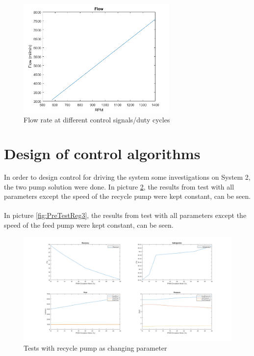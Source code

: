 \begin{figure}[h]
    \centering
    \includegraphics[width=0.7\textwidth]{Flow.png}
    \caption{Flow rate at different control signals/duty cycles}
    \label{fig:Flowrate}
\end{figure}


\section{Design of control algorithms}
In order to design control for driving the system some investigations on System 2, the two pump solution were done. In picture \ref{fig:PreTestReg1}, the results from test with all parameters except the speed of the recycle pump were kept constant, can be seen. \\
\\
In picture \ref{fig:PreTestReg3}, the results from test with all parameters except the speed of the feed pump were kept constant, can be seen.

\begin{figure}[h]
    \centering
    \includegraphics[width=1.65\textwidth, angle = 270]{PreTestReg1.png}
    \caption{Tests with recycle pump as changing parameter}
    \label{fig:PreTestReg1}
\end{figure}

